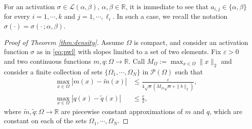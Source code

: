 \documentclass{article}
\newcommand{\R}{\mathbb{R}}
\theoremstyle{plain}
\theoremstyle{definition}
\theoremstyle{definition}
\theoremstyle{remark}
\theoremstyle{definition}
\theoremstyle{definition}
\theoremstyle{remark}
\numberwithin{equation}{section}
\begin{document}
For an activation $\sigma\in\mathcal{L}(\alpha,\beta)$, $\alpha,\beta\in\mathbb{R}$, it is immediate to see that $a_{i,j}\in\{\alpha,\beta\}$ for every $i=1,\cdots,k$ and $j=1,\cdots,\ell_i$. In such a case, we recall the notation $\sigma(\cdot) = \sigma(\cdot\,; \alpha,\beta)$. 

\begin{proof}[Proof of Theorem \ref{thm:density}]
Assume $\Omega$ is compact, and consider an activation function $\sigma$ as in \eqref{eq:pwl} with slopes limited to a set of two elements. %
Fix $\varepsilon>0$ and two continuous functions $m,q:\Omega\to\mathbb{R}$. Call $M_{\Omega}:=\max_{x\in\Omega}\|x\|_2$ and consider a finite collection of sets $\{\Omega_1,\cdots,\Omega_N\}$ in $\mathcal{P}(\Omega)$ such that
\[
\begin{aligned}
\max_{x\in\Omega}|m(x) - \widetilde{m}(x)| &\leq \frac{\varepsilon}{4\sqrt{n}(M_{\Omega}\sqrt{n}+\|b\|_2)},\\
\max_{x\in\Omega}|q(x) - \widetilde{q}(x)| &\leq \frac{\varepsilon}{2},
\end{aligned}
\]
where $\widetilde{m},\widetilde{q}:\Omega\to\mathbb{R}$ are piecewise constant approximations of $m$ and $q$, which are constant on each of the sets $\Omega_1,\cdots,\Omega_N$.


\end{proof}
\end{document}
